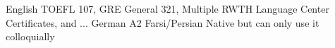 
\begin{cvskills}

  \cvskill
    {English} %
    {TOEFL 107, GRE General 321, Multiple RWTH Language Center Certificates, and ...} %
  \cvskill
    {German} %
    {A2} %
  \cvskill
    {Farsi/Persian} %
    {Native but can only use it colloquially} %

\end{cvskills}
